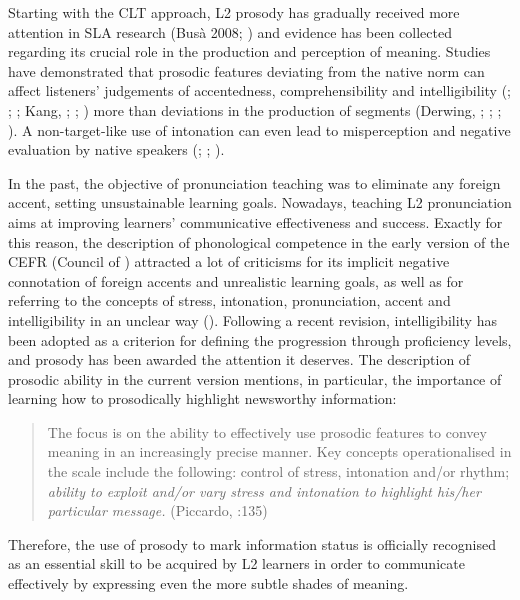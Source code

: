 Starting with the CLT approach, L2 prosody has gradually received more attention in SLA research (Busà 2008; \citealt{Lengeris2012}) and evidence has been collected regarding its crucial role in the production and perception of meaning. Studies have demonstrated that prosodic features deviating from the native norm can affect listeners’ judgements of accentedness, comprehensibility and intelligibility (\citealt{Hahn2004}; \citealt{Jilka2000}; \citealt{Kang2010}; Kang, \citealt{RubinPickering2010}; \citealt{MunroDerwing2001}; \citealt{TrofimovichBaker2006}) more than deviations in the production of segments (Derwing, \citealt{MunroWiebe1998}; \citealt{Munro1995}; \citealt{MunroDerwing1999}; \citealt{GordonDarcy2022}). A non-target-like use of intonation can even lead to misperception and negative evaluation by native speakers (\citealt{Munro2003}; \citealt{MunroDerwing2020}; \citealt{LeVelleLevis2014}).

In the past, the objective of pronunciation teaching was to eliminate any foreign accent, setting unsustainable learning goals. Nowadays, teaching L2 pronunciation aims at improving learners’ communicative effectiveness and success. Exactly for this reason, the description of phonological competence in the early version of the CEFR (Council of \citealt{Europe2001}) attracted a lot of criticisms for its implicit negative connotation of foreign accents and unrealistic learning goals, as well as for referring to the concepts of stress, intonation, pronunciation, accent and intelligibility in an unclear way (\citealt{PiccardoNorth2017}). Following a recent revision, intelligibility has been adopted as a criterion for defining the progression through proficiency levels, and prosody has been awarded the attention it deserves. The description of prosodic ability in the current version mentions, in particular, the importance of learning how to prosodically highlight newsworthy information:

\begin{quote}
The focus is on the ability to effectively use prosodic features to convey meaning in an increasingly precise manner. Key concepts operationalised in the scale include the following: control of stress, intonation and/or rhythm; \textit{ability to exploit and/or vary stress and intonation to highlight his/her particular message.} (Piccardo, \citealt{GoodierNorth2018}:135)
\end{quote}

Therefore, the use of prosody to mark information status is officially recognised as an essential skill to be acquired by L2 learners in order to communicate effectively by expressing even the more subtle shades of meaning.

